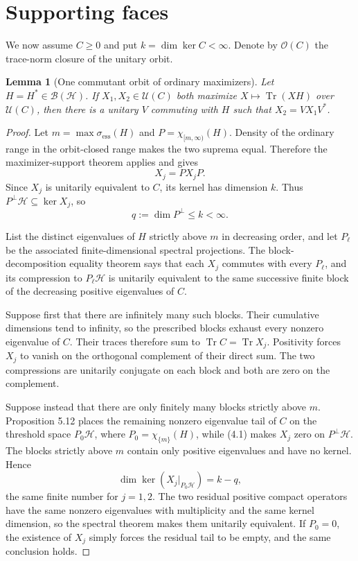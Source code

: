 \documentclass[11pt]{article}
\newtheorem{lemma}[theorem]{Lemma}
\newcommand{\HH}{\mathcal H}
\newcommand{\B}{\mathcal B}
\newcommand{\U}{\mathcal U}
\newcommand{\Tr}{\operatorname{Tr}}
\newcommand{\essspec}{\sigma_{\mathrm{ess}}}
\begin{document}
\section{Supporting faces}

We now assume $C\geq0$ and put $k=\dim\ker C<\infty$.  Denote by
$\mathcal O(C)$ the trace-norm closure of the unitary orbit.

\begin{lemma}[One commutant orbit of ordinary maximizers]
\label{lem:maximizers}
Let $H=H^*\in\B(\HH)$.  If $X_1,X_2\in\U(C)$ both maximize
$X\mapsto\Tr(XH)$ over $\U(C)$, then there is a unitary $V$ commuting with
$H$ such that $X_2=VX_1V^*$.
\end{lemma}

\begin{proof}
Let $m=\max\essspec(H)$ and $P=\chi_{[m,\infty)}(H)$.  Density of the
ordinary range in the orbit-closed range makes the two suprema equal.
Therefore the maximizer-support theorem
\cite[Theorem 5.7]{LP} applies and gives
\[
  X_j=PX_jP.                                               \tag{4.1}
\]
Since $X_j$ is unitarily equivalent to $C$, its kernel has dimension $k$.
Thus $P^\perp\HH\subseteq\ker X_j$, so
\[
  q:=\dim P^\perp\leq k<\infty.                           \tag{4.2}
\]

List the distinct eigenvalues of $H$ strictly above $m$ in decreasing order,
and let $P_\ell$ be the associated finite-dimensional spectral projections.
The block-decomposition equality theorem
\cite[Proposition 5.12]{LP} says that each $X_j$ commutes with every
$P_\ell$, and its compression to $P_\ell\HH$ is unitarily equivalent to the
same successive finite block of the decreasing positive eigenvalues of $C$.

Suppose first that there are infinitely many such blocks.  Their cumulative
dimensions tend to infinity, so the prescribed blocks exhaust every nonzero
eigenvalue of $C$.  Their traces therefore sum to $\Tr C=\Tr X_j$.
Positivity forces $X_j$ to vanish on the orthogonal complement of their
direct sum.  The two compressions are unitarily conjugate on each block and
both are zero on the complement.

Suppose instead that there are only finitely many blocks strictly above $m$.
Proposition 5.12 places the remaining nonzero eigenvalue tail of $C$ on the
threshold space $P_0\HH$, where $P_0=\chi_{\{m\}}(H)$, while (4.1) makes
$X_j$ zero on $P^\perp\HH$.  The blocks strictly above $m$ contain only
positive eigenvalues and have no kernel.  Hence
\[
 \dim\ker(X_j|_{P_0\HH})=k-q,                              \tag{4.3}
\]
the same finite number for $j=1,2$.  The two residual positive compact
operators have the same nonzero eigenvalues with multiplicity and the same
kernel dimension, so the spectral theorem makes them unitarily equivalent.
If $P_0=0$, the existence of $X_j$ simply forces the residual tail to be
empty, and the same conclusion holds.


\end{proof}
\end{document}

